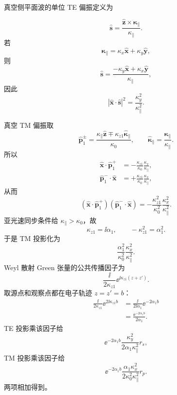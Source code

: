 \begin{derivation}
真空侧平面波的单位 TE 偏振定义为

\[
\hat{\mathbf s}
=\frac{\hat{\mathbf z}\times\mathbf \kappa_\parallel}{\kappa_\parallel}.
\]
若
\[
\mathbf \kappa_\parallel=\kappa_x\hat{\mathbf x}+\kappa_y\hat{\mathbf y},
\]
则
\[
\hat{\mathbf s}
=\frac{-\kappa_y\hat{\mathbf x}+\kappa_x\hat{\mathbf y}}{\kappa_\parallel},
\]
因此
\[
|\hat{\mathbf x}\cdot\hat{\mathbf s}|^2
=\frac{\kappa_y^2}{\kappa_\parallel^2}.
\]

真空 TM 偏振取
\[
\hat{\mathbf p}_1^\pm
=\frac{\kappa_\parallel\hat{\mathbf z}
\mp \kappa_{z1}\hat{\boldsymbol\kappa}_\parallel}{\kappa_0},
\qquad
\hat{\boldsymbol\kappa}_\parallel
=\frac{\mathbf \kappa_\parallel}{\kappa_\parallel}.
\]
所以
\begin{align*}
\hat{\mathbf x}\cdot\hat{\mathbf p}_1^+
&=-\frac{\kappa_{z1}}{\kappa_0}\frac{\kappa_x}{\kappa_\parallel},\\
\hat{\mathbf p}_1^-\cdot\hat{\mathbf x}
&=+\frac{\kappa_{z1}}{\kappa_0}\frac{\kappa_x}{\kappa_\parallel},
\end{align*}
从而
\[
(\hat{\mathbf x}\cdot\hat{\mathbf p}_1^+)
(\hat{\mathbf p}_1^-\cdot\hat{\mathbf x})
=-\frac{\kappa_{z1}^2}{\kappa_0^2}
\frac{\kappa_x^2}{\kappa_\parallel^2}.
\]
亚光速同步条件给 $\kappa_\parallel>\kappa_0$，故
\[
\kappa_{z1}=\ii\alpha_1,
\qquad
-\kappa_{z1}^2=\alpha_1^2.
\]
于是 TM 投影化为
\[
\frac{\alpha_1^2}{\kappa_0^2}
\frac{\kappa_x^2}{\kappa_\parallel^2}.
\]
Weyl 散射 Green 张量的公共传播因子为
\[
\frac{\ii}{2\kappa_{z1}}
\ee^{\ii \kappa_{z1}(z+z')}.
\]
取源点和观察点都在电子轨迹 $z=z'=b$：
\begin{align*}
\frac{\ii}{2\kappa_{z1}}\ee^{2\ii \kappa_{z1}b}
&=\frac{\ii}{2\ii\alpha_1}\ee^{-2\alpha_1 b}\\
&=\frac{\ee^{-2\alpha_1 b}}{2\alpha_1}.
\end{align*}
TE 投影乘该因子给
\[
\ee^{-2\alpha_1 b}\frac{\kappa_y^2}{2\alpha_1 \kappa_\parallel^2}r_s,
\]
TM 投影乘该因子给
\[
\ee^{-2\alpha_1 b}
\frac{\alpha_1 \kappa_x^2}{2\kappa_0^2\kappa_\parallel^2}r_p.
\]
两项相加得到。
\end{derivation}

